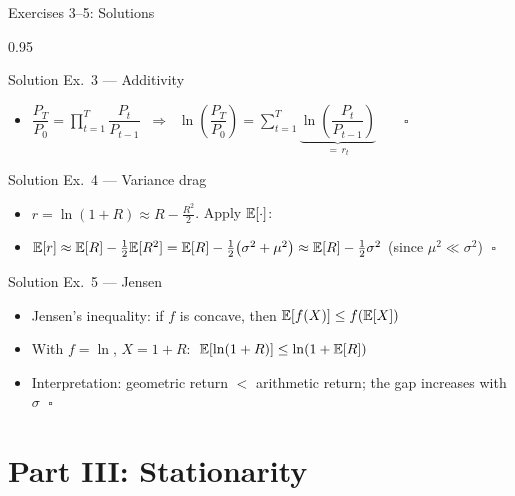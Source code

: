 \documentclass[9pt, aspectratio=169, t]{beamer}
\begin{document}
\begin{frame}[shrink=7]{Exercises 3--5: Solutions}
    \begin{cminipage}{0.95\textwidth}
    \begin{exampleblock}{Solution Ex.\ 3 --- Additivity}
    \begin{itemize}\setlength{\itemsep}{0pt}
        \item $\dfrac{P_T}{P_0} = \displaystyle\prod_{t=1}^{T} \dfrac{P_t}{P_{t-1}} \;\;\Rightarrow\;\; \ln\!\left(\dfrac{P_T}{P_0}\right) = \displaystyle\sum_{t=1}^{T} \underbrace{\ln\!\left(\dfrac{P_t}{P_{t-1}}\right)}_{= \, r_t} \qquad \square$
    \end{itemize}
    \end{exampleblock}
    \vspace{0.2cm}
    \begin{exampleblock}{Solution Ex.\ 4 --- Variance drag}
    \begin{itemize}\setlength{\itemsep}{0pt}
        \item $r = \ln(1+R) \approx R - \tfrac{R^2}{2}$. Apply $\mathbb{E}[\cdot]$:
        \item $\mathbb{E}[r] \approx \mathbb{E}[R] - \tfrac{1}{2}\mathbb{E}[R^2] = \mathbb{E}[R] - \tfrac{1}{2}\bigl(\sigma^2 + \mu^2\bigr) \approx \mathbb{E}[R] - \tfrac{1}{2}\sigma^2$ \quad (since $\mu^2 \ll \sigma^2$) $\;\square$
    \end{itemize}
    \end{exampleblock}
    \vspace{0.2cm}
    \begin{exampleblock}{Solution Ex.\ 5 --- Jensen}
    \begin{itemize}\setlength{\itemsep}{0pt}
        \item Jensen's inequality: if $f$ is concave, then $\mathbb{E}[f(X)] \leq f(\mathbb{E}[X])$
        \item With $f = \ln$, $X = 1+R$: $\;\mathbb{E}[\ln(1+R)] \leq \ln(1+\mathbb{E}[R])$
        \item Interpretation: geometric return $<$ arithmetic return; the gap increases with $\sigma$ $\;\square$
    \end{itemize}
    \end{exampleblock}
    \end{cminipage}
\end{frame}

\section{Part III: Stationarity}
\end{document}
